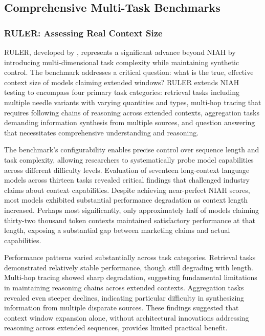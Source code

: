 \subsection{Comprehensive Multi-Task Benchmarks}

\subsubsection{RULER: Assessing Real Context Size}

RULER, developed by \citet{hsieh2024ruler}, represents a significant advance beyond NIAH by introducing multi-dimensional task complexity while maintaining synthetic control. The benchmark addresses a critical question: what is the true, effective context size of models claiming extended windows? RULER extends NIAH testing to encompass four primary task categories: retrieval tasks including multiple needle variants with varying quantities and types, multi-hop tracing that requires following chains of reasoning across extended contexts, aggregation tasks demanding information synthesis from multiple sources, and question answering that necessitates comprehensive understanding and reasoning.

The benchmark's configurability enables precise control over sequence length and task complexity, allowing researchers to systematically probe model capabilities across different difficulty levels. Evaluation of seventeen long-context language models across thirteen tasks revealed critical findings that challenged industry claims about context capabilities. Despite achieving near-perfect NIAH scores, most models exhibited substantial performance degradation as context length increased. Perhaps most significantly, only approximately half of models claiming thirty-two thousand token contexts maintained satisfactory performance at that length, exposing a substantial gap between marketing claims and actual capabilities.

Performance patterns varied substantially across task categories. Retrieval tasks demonstrated relatively stable performance, though still degrading with length. Multi-hop tracing showed sharp degradation, suggesting fundamental limitations in maintaining reasoning chains across extended contexts. Aggregation tasks revealed even steeper declines, indicating particular difficulty in synthesizing information from multiple disparate sources. These findings suggested that context window expansion alone, without architectural innovations addressing reasoning across extended sequences, provides limited practical benefit.

